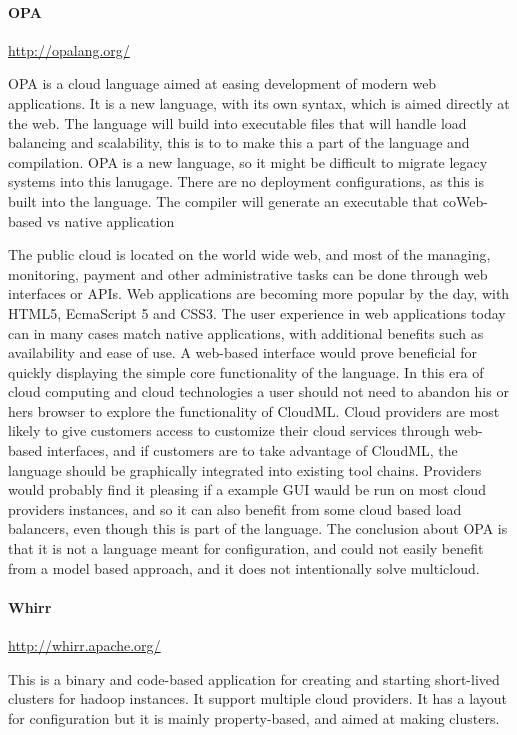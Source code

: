 \paragraph{OPA}
\url{http://opalang.org/}

OPA is a cloud language aimed at easing development of modern web applications. It is a new language, 
with its own syntax, which is aimed directly at the web. The language will build into executable files that will handle load balancing and scalability, 
this is to to make this a part of the language and compilation.
OPA is a new language, so it might be difficult to migrate legacy systems into this lanugage. 
There are no deployment configurations, as this is built into the language. The compiler will generate an executable that coWeb-based vs native application

The public cloud is located on the world wide web, and most of the managing, monitoring, 
payment and other administrative tasks can be done through web interfaces or APIs. 
Web applications are becoming more popular by the day, with HTML5, EcmaScript 5 and CSS3. 
The user experience in web applications today can in many cases match native applications, with additional benefits such as availability and ease of use.
A web-based interface would prove beneficial for quickly displaying the simple core functionality of the language. 
In this era of cloud computing and cloud technologies a user should not need to abandon his or hers browser to explore the functionality of CloudML.
Cloud providers are most likely to give customers access to customize their cloud services through web-based interfaces, 
and if customers are to take advantage of CloudML, the language should be graphically integrated into existing tool chains. 
Providers would probably find it pleasing if a example GUI wauld be run on most cloud providers instances, 
and so it can also benefit from some cloud based load balancers, even though this is part of the language. 
The conclusion about OPA is that it is not a language meant for configuration, and could not easily benefit from a model based approach, 
and it does not intentionally solve multicloud.

\paragraph{Whirr}
\url{http://whirr.apache.org/}

This is a binary and code-based application for creating and starting short-lived clusters for hadoop instances.
It support multiple cloud providers. It has a layout for configuration but it is mainly property-based, and aimed at making clusters. 

